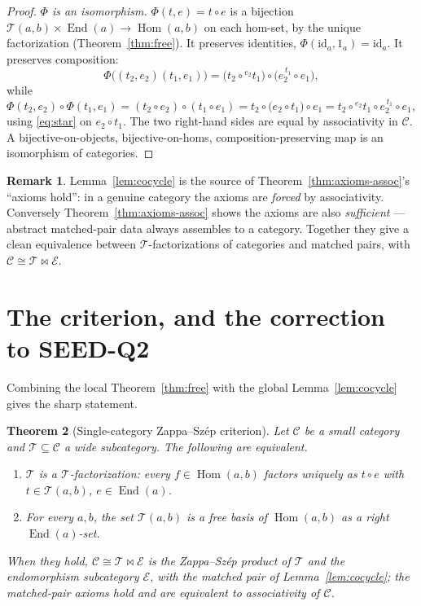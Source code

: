 \documentclass[11pt]{article}
\newtheorem{theorem}{Theorem}
\theoremstyle{definition}
\newtheorem{remark}[theorem]{Remark}
\newcommand{\Hom}{\operatorname{Hom}}
\newcommand{\End}{\operatorname{End}}
\newcommand{\id}{\mathrm{id}}
\newcommand{\C}{\mathcal{C}}
\newcommand{\T}{\mathcal{T}}
\newcommand{\E}{\mathcal{E}}
\newcommand{\lact}[2]{{}^{#1}\!#2}      %
\newcommand{\rest}[2]{#1^{\,#2}}        %
\begin{document}
\begin{proof}
\emph{$\Phi$ is an isomorphism.} $\Phi(t,e)=t\circ e$ is a bijection
$\T(a,b)\times\End(a)\to\Hom(a,b)$ on each hom-set, by the unique factorization
(Theorem~\ref{thm:free}). It preserves identities, $\Phi(\id_a,1_a)=\id_a$. It
preserves composition:
\[
  \Phi\bigl((t_2,e_2)(t_1,e_1)\bigr)
  =\bigl(t_2\circ\lact{e_2}{t_1}\bigr)\circ\bigl(\rest{e_2}{t_1}\circ e_1\bigr),
\]
while
\[
  \Phi(t_2,e_2)\circ\Phi(t_1,e_1)=(t_2\circ e_2)\circ(t_1\circ e_1)
  =t_2\circ\bigl(e_2\circ t_1\bigr)\circ e_1
  =t_2\circ\lact{e_2}{t_1}\circ\rest{e_2}{t_1}\circ e_1,
\]
using \eqref{eq:star} on $e_2\circ t_1$. The two right-hand sides are equal by
associativity in $\C$. A bijective-on-objects, bijective-on-homs,
composition-preserving map is an isomorphism of categories.
\end{proof}

\begin{remark}
Lemma~\ref{lem:cocycle} is the source of Theorem~\ref{thm:axioms-assoc}'s
``axioms hold'': in a genuine category the axioms are \emph{forced} by
associativity. Conversely Theorem~\ref{thm:axioms-assoc} shows the axioms are also
\emph{sufficient} --- abstract matched-pair data always assembles to a category.
Together they give a clean equivalence between $\T$-factorizations of categories
and matched pairs, with $\C\cong\T\bowtie\E$.
\end{remark}

\section{The criterion, and the correction to SEED-Q2}

Combining the local Theorem~\ref{thm:free} with the global Lemma~\ref{lem:cocycle}
gives the sharp statement.

\begin{theorem}[Single-category Zappa--Sz\'ep criterion]\label{thm:criterion}
Let $\C$ be a small category and $\T\subseteq\C$ a wide subcategory. The following
are equivalent.
\begin{enumerate}
\item $\T$ is a $\T$-factorization: every $f\in\Hom(a,b)$ factors uniquely as
$t\circ e$ with $t\in\T(a,b)$, $e\in\End(a)$.
\item For every $a,b$, the set $\T(a,b)$ is a free basis of $\Hom(a,b)$ as a right
$\End(a)$-set.
\end{enumerate}
When they hold, $\C\cong\T\bowtie\E$ is the Zappa--Sz\'ep product of $\T$ and the
endomorphism subcategory $\E$, with the matched pair of Lemma~\ref{lem:cocycle};
the matched-pair axioms hold and are equivalent to associativity of $\C$.
\end{theorem}
\end{document}
